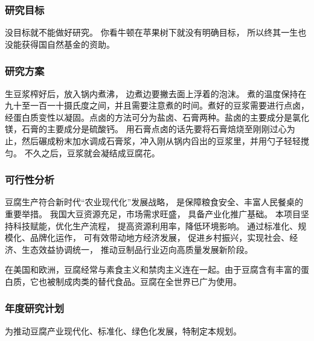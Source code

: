 \documentclass{nsfc}
\begin{document}
\subsubsection{研究目标}

没目标就不能做好研究。
你看牛顿在苹果树下就没有明确目标，
所以终其一生也没能获得国自然基金的资助。


\vspace{1.5em}


\subsubsection{研究方案}

生豆浆榨好后，放入锅内煮沸，
边煮边要撇去面上浮着的泡沫。
煮的温度保持在九十至一百一十摄氏度之间，并且需要注意煮的时间。煮好的豆浆需要进行点卤，经蛋白质变性以凝固。点卤的方法可分为盐卤、石膏两种。盐卤的主要成分是氯化镁，石膏的主要成分是硫酸钙。
用石膏点卤的话先要将石膏焙烧至刚刚过心为止，然后碾成粉末加水调成石膏浆，冲入刚从锅内舀出的豆浆里，并用勺子轻轻搅匀。
不久之后，豆浆就会凝结成豆腐花。

\subsubsection{可行性分析}
豆腐生产符合新时代“农业现代化”发展战略，
是保障粮食安全、丰富人民餐桌的重要举措。
我国大豆资源充足，市场需求旺盛，
具备产业化推广基础。
本项目坚持科技赋能，优化生产流程，
提高资源利用率，降低环境影响。
通过标准化、规模化、品牌化运作，
可有效带动地方经济发展，
促进乡村振兴，实现社会、经济、生态效益协调统一，
推动豆制品行业迈向高质量发展新阶段。


在美国和欧洲，豆腐经常与素食主义和禁肉主义连在一起。由于豆腐含有丰富的蛋白质，它也被制成肉类的替代食品。豆腐在全世界已广为使用。



\subsubsection{年度研究计划}
为推动豆腐产业现代化、标准化、绿色化发展，特制定本规划。

\end{document}
